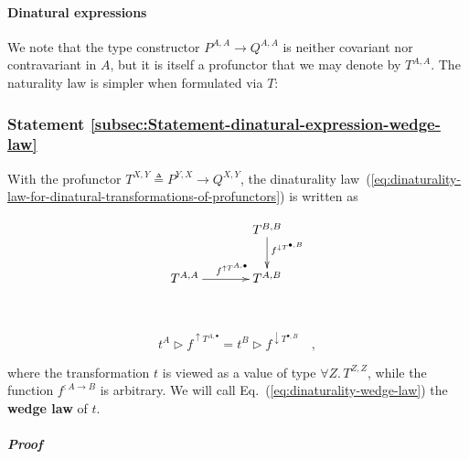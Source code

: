 \paragraph{Dinatural expressions}

We note that the type constructor $P^{A,A}\rightarrow Q^{A,A}$ is
neither covariant nor contravariant in $A$, but it is itself a profunctor
that we may denote by $T^{A,A}$. The naturality law is simpler when
formulated via $T$:

\subsubsection{Statement \label{subsec:Statement-dinatural-expression-wedge-law}\ref{subsec:Statement-dinatural-expression-wedge-law}}

With the profunctor $T^{X,Y}\triangleq P^{Y,X}\rightarrow Q^{X,Y}$,
the dinaturality law~(\ref{eq:dinaturality-law-for-dinatural-transformations-of-profunctors})
is written as

\begin{wrapfigure}[9]{l}{0.24\columnwidth}%
\vspace{-1.5\baselineskip}
\[
\xymatrix{\xyScaleY{2.0pc}\xyScaleX{3.0pc} & T^{B,B}\ar[d]\sp(0.37){f^{\downarrow T^{\bullet,B}}}\\
T^{A,A}\ar[r]\sp(0.5){~~~f^{\uparrow T^{A,\bullet}}} & T^{A,B}
}
\]

\vspace{-0\baselineskip}
\end{wrapfigure}%

~\vspace{-0.8\baselineskip}

\begin{equation}
t^{A}\triangleright f^{\uparrow T^{A,\bullet}}=t^{B}\triangleright f^{\downarrow T^{\bullet,B}}\quad,\label{eq:dinaturality-wedge-law}
\end{equation}
\vspace{-0.8\baselineskip}

\noindent where the transformation $t$ is viewed as a value of type
$\forall Z.\,T^{Z,Z}$, while the function $f^{:A\rightarrow B}$
is arbitrary. We will call Eq.~(\ref{eq:dinaturality-wedge-law})
the \textbf{wedge law} of $t$.

\subparagraph{Proof}

